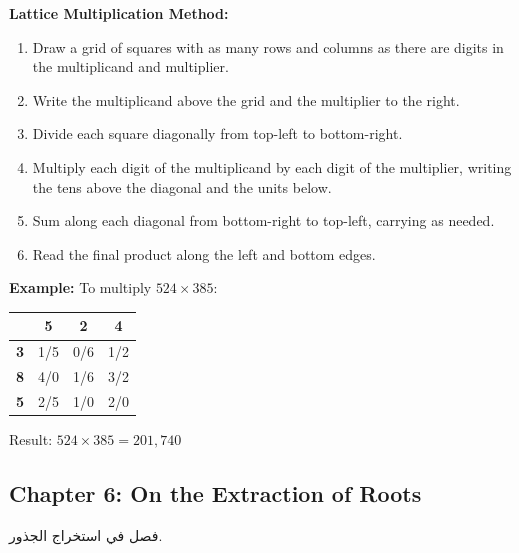 \documentclass[11pt,a4paper]{article}
\newenvironment{arabicbox}{%
  \begin{framed}
  \begin{minipage}{\dimexpr\linewidth-2\fboxsep-2\fboxrule\relax}
  \setlength{\parindent}{0pt}
  \linespread{1.3}\selectfont
}{%
  \end{minipage}
  \end{framed}
}
\newenvironment{mathalgo}{%
  \par\vspace{0.3cm}
  \begin{framed}
  \setlength{\parindent}{0pt}
}{%
  \end{framed}
  \par\vspace{0.3cm}
}
\begin{document}
\begin{mathalgo}
\textbf{Lattice Multiplication Method:}
\begin{enumerate}[nosep]
  \item Draw a grid of squares with as many rows and columns as there are
  digits in the multiplicand and multiplier.
  \item Write the multiplicand above the grid and the multiplier to the
  right.
  \item Divide each square diagonally from top-left to bottom-right.
  \item Multiply each digit of the multiplicand by each digit of the
  multiplier, writing the tens above the diagonal and the units below.
  \item Sum along each diagonal from bottom-right to top-left, carrying
  as needed.
  \item Read the final product along the left and bottom edges.
\end{enumerate}
\end{mathalgo}

\noindent\textbf{Example:} To multiply $524 \times 385$:

\begin{center}
\begin{tabular}{|c|c|c|c|}
\hline
& \textbf{5} & \textbf{2} & \textbf{4} \\
\hline
\textbf{3} & \multicolumn{1}{c|}{1/5} & \multicolumn{1}{c|}{0/6} & \multicolumn{1}{c|}{1/2} \\
\hline
\textbf{8} & \multicolumn{1}{c|}{4/0} & \multicolumn{1}{c|}{1/6} & \multicolumn{1}{c|}{3/2} \\
\hline
\textbf{5} & \multicolumn{1}{c|}{2/5} & \multicolumn{1}{c|}{1/0} & \multicolumn{1}{c|}{2/0} \\
\hline
\end{tabular}
\end{center}

\noindent Result: $\boxed{524 \times 385 = 201{,}740}$

\subsection{Chapter 6: On the Extraction of Roots}

\begin{arabicbox}
\begin{Arabic}
فصل في استخراج الجذور.
\end{Arabic}
\end{arabicbox}
\end{document}
